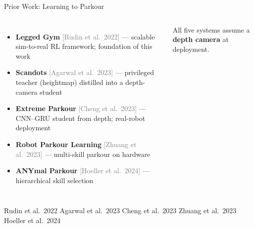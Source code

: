 \documentclass[aspectratio=169,10pt]{beamer}
\newcommand{\source}[1]{\vfill{\tiny\color{gray}#1\par}}
\begin{document}
\begin{frame}{Prior Work: Learning to Parkour}
\begin{columns}[T]
  {\small
  \begin{itemize}
    \setlength\itemsep{0.55em}
    \item \textbf{Legged Gym} \textcolor{gray}{\scriptsize[Rudin et al.\ 2022]} ---
          scalable sim-to-real RL framework; foundation of this work
    \item \textbf{Scandots} \textcolor{gray}{\scriptsize[Agarwal et al.\ 2023]} ---
          privileged teacher (heightmap) distilled into a depth-camera student
    \item \textbf{Extreme Parkour} \textcolor{gray}{\scriptsize[Cheng et al.\ 2023]} ---
          CNN--GRU student from depth; real-robot deployment
    \item \textbf{Robot Parkour Learning} \textcolor{gray}{\scriptsize[Zhuang et al.\ 2023]}
          --- multi-skill parkour on hardware
    \item \textbf{ANYmal Parkour} \textcolor{gray}{\scriptsize[Hoeller et al.\ 2024]} ---
          hierarchical skill selection
  \end{itemize}
  }
  \vspace{0.5em}
  \alert{All five systems assume a \textbf{depth camera} at deployment.}
\end{columns}
\source{Rudin et al.\ 2022 \textbar{} Agarwal et al.\ 2023 \textbar{}
        Cheng et al.\ 2023 \textbar{} Zhuang et al.\ 2023 \textbar{} Hoeller et al.\ 2024}
\end{frame}
\end{document}
